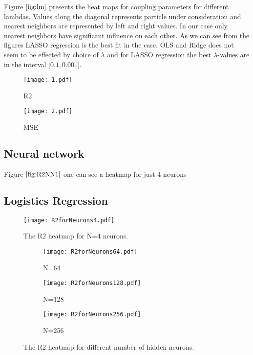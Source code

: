 \documentclass[10pt]{article}
\begin{document}
Figure $\ref{fig:lm}$ presents the heat maps for coupling parameters for different lambdas. Values along the diagonal represents particle under consideration and nearest neighbors are represented by left and right values. In our case only nearest neighbors have significant influence on each other. As we can see from the figures LASSO regression is the best fit in the case. OLS and Ridge does not seem to be effected by choice of $\lambda$ and for LASSO regression the best $\lambda$-values are in the interval $\lbrack \num{0.1} , \num{0.001} \rbrack$.

\begin{figure}
	\centerline{\texttt{[image: 1.pdf]}}
	\caption{R2}
	\label{plt:R2"}
\end{figure}

\begin{figure}
	\centerline{\texttt{[image: 2.pdf]}}
	\caption{MSE}
	\label{plt:MSE"}
\end{figure}

\subsection{Neural network}
Figure $\ref{fig:R2NN1}$ one can see a heatmap for just 4 neurons 

\subsection{Logistics Regression}

	\begin{figure}
		\centering
		\texttt{[image: R2forNeurons4.pdf]}
		\caption[ The R2 heatmap for N=4 neurons.]
		{\small The R2 heatmap for N=4 neurons.} 
		\label{fig:R2NN1}
	\end{figure}

	\begin{figure}
	\centering
			
	\begin{subfigure}[b]{0.9\textwidth}  
		\centering 
		\texttt{[image: R2forNeurons64.pdf]}
		\caption[]%
		{{\small N=64}}    
		\label{fig:mean and std of net24}
	\end{subfigure}
	\hfill
	\begin{subfigure}[b]{0.9\textwidth}   
		\centering 
		\texttt{[image: R2forNeurons128.pdf]}
		\caption[]%
		{{\small N=128}}    
		\label{fig:mean and std of net34}
	\end{subfigure}
	\quad
	\begin{subfigure}[b]{0.9\textwidth}   
		\centering 
		\texttt{[image: R2forNeurons256.pdf]}
		\caption[]%
		{{\small N=256}}    
		\label{fig:mean and std of net44}
	\end{subfigure}
	\caption[ The average and standard deviation of critical parameters ]
	{\small The R2 heatmap for different number of hidden neurons.} 
	\label{fig:mean and std of nets}
\end{figure}
\end{document}
